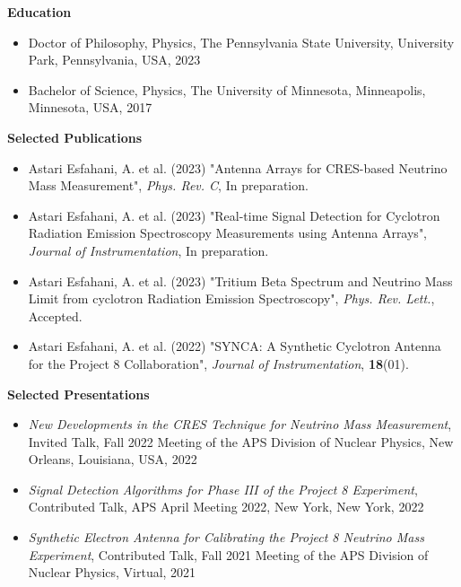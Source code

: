 
\textbf{Education}
\begin{itemize}
    \item Doctor of Philosophy, Physics, The Pennsylvania State University, University Park, Pennsylvania, USA, 2023
    \item Bachelor of Science, Physics, The University of Minnesota, Minneapolis, Minnesota, USA, 2017
\end{itemize}

\textbf{Selected Publications}
\begin{itemize}
    \item Astari Esfahani, A. et al. (2023) "Antenna Arrays for CRES-based Neutrino Mass Measurement", \emph{Phys. Rev. C}, In preparation.
    \item Astari Esfahani, A. et al. (2023) "Real-time Signal Detection for Cyclotron Radiation Emission Spectroscopy Measurements using Antenna Arrays", \emph{Journal of Instrumentation}, In preparation.
    \item Astari Esfahani, A. et al. (2023) "Tritium Beta Spectrum and Neutrino Mass Limit from cyclotron Radiation Emission Spectroscopy", \emph{Phys. Rev. Lett.}, Accepted.
    \item Astari Esfahani, A. et al. (2022) "SYNCA: A Synthetic Cyclotron Antenna for the Project 8 Collaboration", \emph{Journal of Instrumentation}, \textbf{18}(01).
\end{itemize}

\textbf{Selected Presentations}
\begin{itemize}
    \item \emph{New Developments in the CRES Technique for Neutrino Mass Measurement}, Invited Talk, Fall 2022 Meeting of the APS Division of Nuclear Physics, New Orleans, Louisiana, USA, 2022
    \item \emph{Signal Detection Algorithms for Phase III of the Project 8 Experiment}, Contributed Talk, APS April Meeting 2022, New York, New York, 2022
    \item \emph{Synthetic Electron Antenna for Calibrating the Project 8 Neutrino Mass Experiment}, Contributed Talk, Fall 2021 Meeting of the APS Division of Nuclear Physics, Virtual, 2021
\end{itemize}

